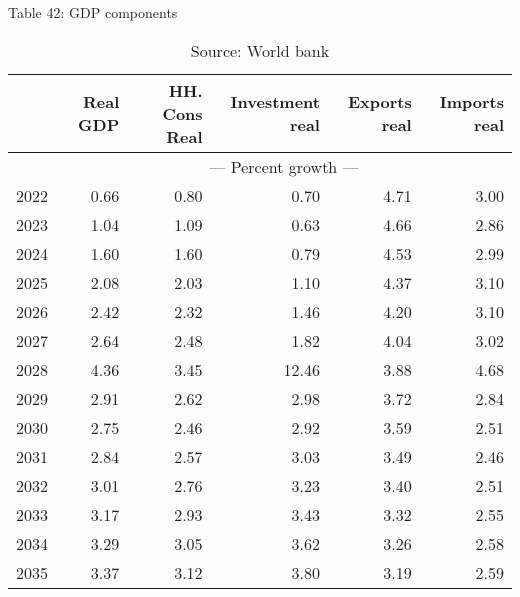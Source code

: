 \documentclass{article}
\begin{document}
\begin{table}[ht]
\caption*{Table 42: GDP components}
\begin{tabular}{lrrrrr}
\toprule
 & Real GDP & HH. Cons Real & Investment real & Exports real & Imports real \\
\midrule
 & \multicolumn{5}{c}{--- Percent growth ---} \\
2022 & 0.66 & 0.80 & 0.70 & 4.71 & 3.00 \\
2023 & 1.04 & 1.09 & 0.63 & 4.66 & 2.86 \\
2024 & 1.60 & 1.60 & 0.79 & 4.53 & 2.99 \\
2025 & 2.08 & 2.03 & 1.10 & 4.37 & 3.10 \\
2026 & 2.42 & 2.32 & 1.46 & 4.20 & 3.10 \\
2027 & 2.64 & 2.48 & 1.82 & 4.04 & 3.02 \\
2028 & 4.36 & 3.45 & 12.46 & 3.88 & 4.68 \\
2029 & 2.91 & 2.62 & 2.98 & 3.72 & 2.84 \\
2030 & 2.75 & 2.46 & 2.92 & 3.59 & 2.51 \\
2031 & 2.84 & 2.57 & 3.03 & 3.49 & 2.46 \\
2032 & 3.01 & 2.76 & 3.23 & 3.40 & 2.51 \\
2033 & 3.17 & 2.93 & 3.43 & 3.32 & 2.55 \\
2034 & 3.29 & 3.05 & 3.62 & 3.26 & 2.58 \\
2035 & 3.37 & 3.12 & 3.80 & 3.19 & 2.59 \\
\bottomrule
\end{tabular}
\caption*{Source: World bank }
\end{table}
\end{document}
